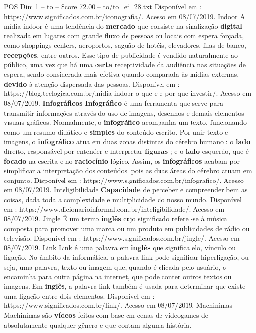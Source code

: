 \begin{textsample}{POS Dim 1 – to – Score 72.00 – to/to\_ef\_28.txt}
Disponível em : https://www.significados.com.br/iconografia/.
Acesso em 08/07/2019.
Indoor A mídia indoor é uma tendência do \textbf{mercado} que consiste na sinalização \textbf{digital} realizada em lugares com grande fluxo de pessoas ou locais com espera forçada, como shoppings centers, aeroportos, saguão de hotéis, elevadores, filas de banco, \textbf{recepções}, entre outros.
Esse tipo de publicidade é vendido naturalmente ao público, uma vez que há uma \textbf{certa} receptividade da audiência nas situações de espera, sendo considerada mais efetiva quando comparada às mídias externas, \textbf{devido} à atenção dispersada das pessoas.
Disponível em : https://blog.teclogica.com.br/midia-indoor-o-que-e-e-por-que-investir/.
Acesso em 08/07/2019. \textbf{Infográficos} \textbf{Infográfico} é uma ferramenta que serve para transmitir informações através do uso de imagens, desenhos e demais elementos visuais gráficos.
Normalmente, o \textbf{infográfico} acompanha um texto, funcionando como um resumo didático e \textbf{simples} do conteúdo escrito.
Por unir texto e imagens, o \textbf{infográfico} atua em duas zonas distintas do cérebro humano : o \textbf{lado} direito, responsável por entender e interpretar \textbf{figuras} ; e o \textbf{lado} esquerdo, que é \textbf{focado} na escrita e no \textbf{raciocínio} lógico.
Assim, os \textbf{infográficos} acabam por simplificar a interpretação dos conteúdos, pois as duas áreas do cérebro atuam em conjunto.
Disponível em : https://www.significados.com.br/infografico/.
Acesso em 08/07/2019.
Inteligibilidade \textbf{Capacidade} de perceber e compreender bem as coisas, dada toda a complexidade e multiplicidade do nosso mundo.
Disponível em : https://www.dicionarioinformal.com.br/inteligibilidade/.
Acesso em 08/07/2019.
Jingle É um termo \textbf{inglês} cujo significado refere -se à música composta para promover uma marca ou um produto em publicidades de rádio ou televisão.
Disponível em : https://www.significados.com.br/jingle/.
Acesso em 08/07/2019.
Link Link é uma palavra em \textbf{inglês} que significa elo, vínculo ou ligação.
No âmbito da informática, a palavra link pode significar hiperligação, ou seja, uma palavra, texto ou imagem que, quando é clicada pelo usuário, o encaminha para outra página na internet, que pode conter outros textos ou imagens.
Em \textbf{inglês}, a palavra link também é usada para determinar que existe uma ligação entre dois elementos.
Disponível em : https://www.significados.com.br/link/.
Acesso em 08/07/2019.
Machinimas Machinimas são \textbf{vídeos} feitos com base em cenas de videogames de absolutamente qualquer gênero e que contam alguma história.

\end{textsample}
